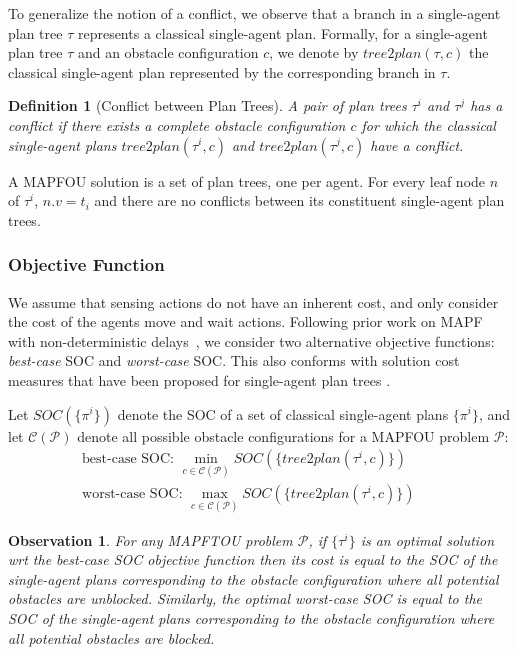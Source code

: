 \documentclass[letterpaper]{article} %
\newcommand{\blocked}{\textit{blocked}}
\newcommand{\unblocked}{\textit{unblocked}}
\newcommand{\toplan}{\textit{tree2plan}}
\newtheorem{observation}{Observation}
\newtheorem{definition}{Definition}
\begin{document}
To generalize the notion of a conflict, we observe that a
branch in a single-agent plan tree $\tau$ represents a classical single-agent plan. Formally, for a single-agent plan tree $\tau$ and an obstacle configuration $c$, we denote by $\toplan(\tau,c)$ the classical single-agent plan represented by the corresponding branch in $\tau$.
\begin{definition}[Conflict between Plan Trees]
A pair of plan trees $\tau^i$ and $\tau^j$ has a conflict if there exists a complete obstacle configuration $c$
for which the classical single-agent plans $\toplan(\tau^i,c)$ and $\toplan(\tau^j,c)$ have a conflict.
\label{def:conflicting-plan-trees}
\end{definition}
A  MAPFOU solution is a set of plan trees, one per agent. For every leaf node $n$ of $\tau^i$, $n.v=t_i$ and there are no conflicts between its constituent single-agent plan trees.



\subsubsection*{Objective Function}


We assume that sensing actions do not have an inherent cost, and only consider the cost of the agents move and wait actions.
Following prior work on MAPF with non-deterministic delays~\cite{shahar2021safe}, we consider two alternative objective functions: \emph{best-case} SOC and \emph{worst-case} SOC.
This also conforms with solution cost measures that have been proposed for single-agent plan trees \cite{shmaryahu2019comparative}.


Let $SOC(\{\pi^i\})$ denote the SOC of a set of classical single-agent plans $\{\pi^i\}$, and let $\mathcal{C}(\mathcal{P})$ denote all possible obstacle configurations for a MAPFOU problem $\mathcal{P}$:
\begin{eqnarray}
 \mbox{best-case SOC: } \min_{c\in\mathcal{C}(\mathcal{P})} SOC(\{\toplan(\tau^i,c)\}) &&\\
 \mbox{worst-case SOC: } \max_{c\in\mathcal{C}(\mathcal{P})} SOC(\{\toplan(\tau^i,c)\})&&
\end{eqnarray}


\begin{observation}
For any MAPFTOU problem $\mathcal{P}$, if $\{\tau^i\}$ is an optimal solution wrt
the best-case SOC objective function then its cost is equal to the SOC of the single-agent plans corresponding to the obstacle configuration where all potential obstacles are \unblocked.
Similarly, the optimal worst-case SOC is equal to the SOC of the single-agent plans corresponding to the obstacle configuration where all potential obstacles are \blocked.
\label{obs:best-and-worst}
\end{observation}
\end{document}
